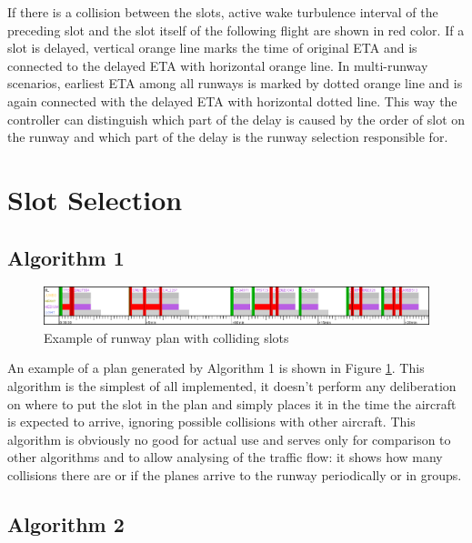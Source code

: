 If there is a collision between the slots, active wake turbulence interval of the preceding slot and the slot itself of the following flight are shown in red color. If a slot is delayed, vertical orange line marks the time of original ETA and is connected to the delayed ETA with horizontal orange line. In multi-runway scenarios, earliest ETA among all runways is marked by dotted orange line and is again connected with the delayed ETA with horizontal dotted line. This way the controller can distinguish which part of the delay is caused by the order of slot on the runway and which part of the delay is the runway selection responsible for.

\section{Slot Selection}


\subsection{Algorithm 1}

\begin{figure}[h]
    \centering
    \includegraphics[width=\textwidth]{figures/rwy-in-place.png}
    \caption{Example of runway plan with colliding slots}
    \label{fig:rwy-in-place}
\end{figure}

An example of a plan generated by Algorithm 1 is shown in Figure \ref{fig:rwy-in-place}. This algorithm is the simplest of all implemented, it doesn't perform any deliberation on where to put the slot in the plan and simply places it in the time the aircraft is expected to arrive, ignoring possible collisions with other aircraft. This algorithm is obviously no good for actual use and serves only for comparison to other algorithms and to allow analysing of the traffic flow: it shows how many collisions there are or if the planes arrive to the runway periodically or in groups.

\subsection{Algorithm 2}

